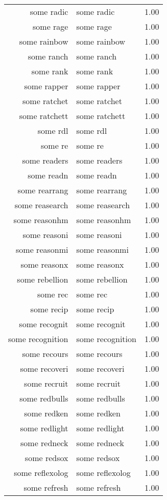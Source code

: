 \begin{table}[ht]
\begin{tabular}{rlr}
  some radic & some radic & 1.00 \\ 
  some rage & some rage & 1.00 \\ 
  some rainbow & some rainbow & 1.00 \\ 
  some ranch & some ranch & 1.00 \\ 
  some rank & some rank & 1.00 \\ 
  some rapper & some rapper & 1.00 \\ 
  some ratchet & some ratchet & 1.00 \\ 
  some ratchett & some ratchett & 1.00 \\ 
  some rdl & some rdl & 1.00 \\ 
  some re & some re & 1.00 \\ 
  some readers & some readers & 1.00 \\ 
  some readn & some readn & 1.00 \\ 
  some rearrang & some rearrang & 1.00 \\ 
  some reasearch & some reasearch & 1.00 \\ 
  some reasonhm & some reasonhm & 1.00 \\ 
  some reasoni & some reasoni & 1.00 \\ 
  some reasonmi & some reasonmi & 1.00 \\ 
  some reasonx & some reasonx & 1.00 \\ 
  some rebellion & some rebellion & 1.00 \\ 
  some rec & some rec & 1.00 \\ 
  some recip & some recip & 1.00 \\ 
  some recognit & some recognit & 1.00 \\ 
  some recognition & some recognition & 1.00 \\ 
  some recours & some recours & 1.00 \\ 
  some recoveri & some recoveri & 1.00 \\ 
  some recruit & some recruit & 1.00 \\ 
  some redbulls & some redbulls & 1.00 \\ 
  some redken & some redken & 1.00 \\ 
  some redlight & some redlight & 1.00 \\ 
  some redneck & some redneck & 1.00 \\ 
  some redsox & some redsox & 1.00 \\ 
  some reflexolog & some reflexolog & 1.00 \\ 
  some refresh & some refresh & 1.00 \\ 

\end{tabular}
\end{table}
